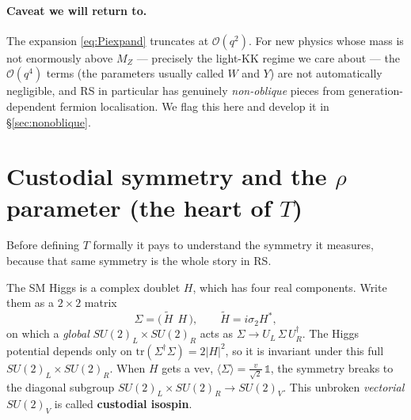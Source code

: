 \documentclass[11pt]{article}
\newcommand{\vev}{v}
\newcommand{\SUL}{SU(2)_L}
\newcommand{\SUR}{SU(2)_R}
\theoremstyle{definition}
\begin{document}
\paragraph{Caveat we will return to.} The expansion \eqref{eq:Piexpand} truncates
at $\mathcal{O}(q^2)$. For new physics whose mass is not enormously above $M_Z$
--- precisely the light-KK regime we care about --- the $\mathcal{O}(q^4)$ terms
(the parameters usually called $W$ and $Y$) are not automatically negligible,
and RS in particular has genuinely \emph{non-oblique} pieces from
generation-dependent fermion localisation. We flag this here and develop it in
\S\ref{sec:nonoblique}.

\section{Custodial symmetry and the $\rho$ parameter (the heart of $T$)}
\label{sec:custodialSM}

Before defining $T$ formally it pays to understand the symmetry it measures,
because that same symmetry is the whole story in RS.

The SM Higgs is a complex doublet $H$, which has four real components. Write them
as a $2\times 2$ matrix
\begin{equation}
\Sigma = \big(\,\tilde H\ \ H\,\big), \qquad \tilde H = i\sigma_2 H^*,
\end{equation}
on which a \emph{global} $\SUL\times\SUR$ acts as
$\Sigma \to U_L\,\Sigma\,U_R^\dagger$. The Higgs potential depends only on
$\mathrm{tr}(\Sigma^\dagger\Sigma)=2|H|^2$, so it is invariant under this full
$\SUL\times\SUR$. When $H$ gets a vev, $\langle\Sigma\rangle = \frac{\vev}{\sqrt2}\,
\mathbb{1}$, the symmetry breaks to the diagonal subgroup
$\SUL\times\SUR \to SU(2)_V$. This unbroken \emph{vectorial} $SU(2)_V$ is called
\textbf{custodial isospin}.
\end{document}
